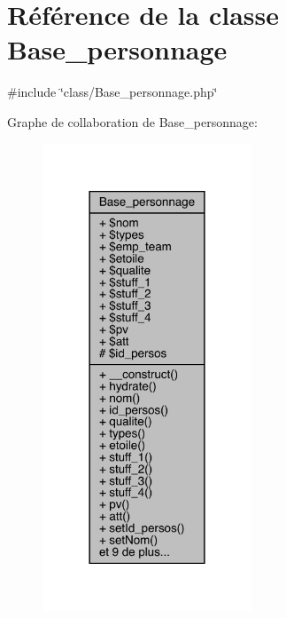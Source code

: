 \hypertarget{class_base__personnage}{}\section{Référence de la classe Base\+\_\+personnage}
\label{class_base__personnage}


{\ttfamily \#include \char`\"{}class/\+Base\+\_\+personnage.\+php\char`\"{}}



Graphe de collaboration de Base\+\_\+personnage\+:\nopagebreak
\begin{figure}[H]
\begin{center}
\leavevmode
\includegraphics[width=177pt]{class_base__personnage__coll__graph}
\end{center}
\end{figure}
